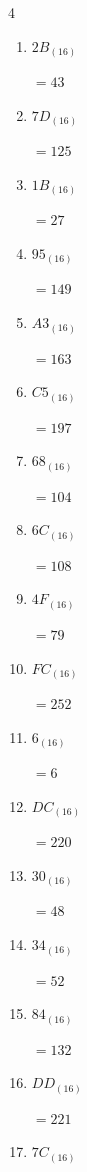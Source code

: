 \begin{multicols}{4}
\begin{enumerate}
  \item $2B_{(16)}$

        $=43$

  \item $7D_{(16)}$

        $=125$

  \item $1B_{(16)}$

        $=27$

  \item $95_{(16)}$

        $=149$

  \item $A3_{(16)}$

        $=163$

  \item $C5_{(16)}$

        $=197$

  \item $68_{(16)}$

        $=104$

  \item $6C_{(16)}$

        $=108$

  \item $4F_{(16)}$

        $=79$

  \item $FC_{(16)}$

        $=252$

  \item $6_{(16)}$

        $=6$

  \item $DC_{(16)}$

        $=220$

\columnbreak %

  \item $30_{(16)}$

        $=48$

  \item $34_{(16)}$

        $=52$

  \item $84_{(16)}$

        $=132$

  \item $DD_{(16)}$

        $=221$

  \item $7C_{(16)}$


\end{enumerate}
\end{multicols}
